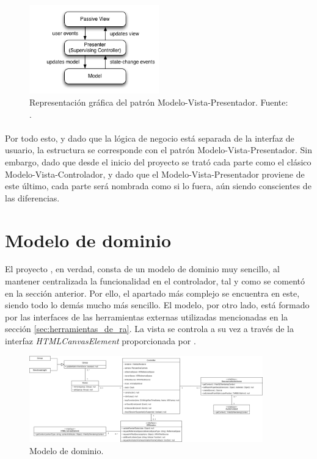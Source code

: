 \documentclass{subfiles}
\begin{document}
        \begin{figure}
        \centering
        \includegraphics[width=0.5\textwidth]{img/mvp.png}
        \caption{Representación gráfica del patrón Modelo-Vista-Presentador. Fuente: .}
        \label{fig:mvp}
        \end{figure}

        \paragraph{}
        Por todo esto, y dado que la lógica de negocio está separada de la interfaz de usuario, la estructura se corresponde con el patrón Modelo-Vista-Presentador. Sin embargo, dado que desde el inicio del proyecto se trató cada parte como el clásico Modelo-Vista-Controlador, y dado que el Modelo-Vista-Presentador proviene de este último, cada parte será nombrada como si lo fuera, aún siendo conscientes de las diferencias.

        \section{Modelo de dominio}
        \label{sec:modelo_de_dominio}
        El proyecto \titlename, en verdad, consta de un modelo de dominio muy sencillo, al mantener centralizada la funcionalidad en el controlador, tal y como se comentó en la sección anterior. Por ello, el apartado más complejo se encuentra en este, siendo todo lo demás mucho más sencillo. El modelo, por otro lado, está formado por las interfaces de las herramientas externas utilizadas mencionadas en la sección \ref{sec:herramientas_de_ra}. La vista se controla a su vez a través de la interfaz \textit{HTMLCanvasElement} proporcionada por \js.

\begin{figure}[ht]
\centering
\includegraphics[width=0.9\textwidth]{img/analisis_modelo_de_dominio.png}
\caption{Modelo de dominio.}
\label{fig:analisis_modelo_de_dominio}
\end{figure}
\end{document}
